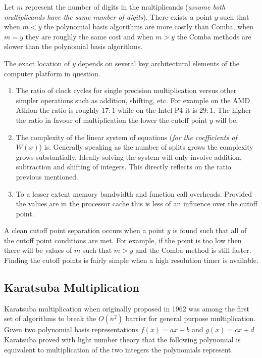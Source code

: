 \documentclass[b5paper]{book}
\begin{document}
Let $m$ represent the number of digits in the multiplicands (\textit{assume both multiplicands have the same number of digits}).  There exists a 
point $y$ such that when $m < y$ the polynomial basis algorithms are more costly than Comba, when $m = y$ they are roughly the same cost and 
when $m > y$ the Comba methods are slower than the polynomial basis algorithms.  

The exact location of $y$ depends on several key architectural elements of the computer platform in question.

\begin{enumerate}
\item  The ratio of clock cycles for single precision multiplication versus other simpler operations such as addition, shifting, etc.  For example
on the AMD Athlon the ratio is roughly $17 : 1$ while on the Intel P4 it is $29 : 1$.  The higher the ratio in favour of multiplication the lower
the cutoff point $y$ will be.  

\item  The complexity of the linear system of equations (\textit{for the coefficients of $W(x)$}) is.  Generally speaking as the number of splits
grows the complexity grows substantially.  Ideally solving the system will only involve addition, subtraction and shifting of integers.  This
directly reflects on the ratio previous mentioned.

\item  To a lesser extent memory bandwidth and function call overheads.  Provided the values are in the processor cache this is less of an
influence over the cutoff point.

\end{enumerate}

A clean cutoff point separation occurs when a point $y$ is found such that all of the cutoff point conditions are met.  For example, if the point
is too low then there will be values of $m$ such that $m > y$ and the Comba method is still faster.  Finding the cutoff points is fairly simple when
a high resolution timer is available.  

\subsection{Karatsuba Multiplication}
Karatsuba multiplication \cite{KARA} when originally proposed in 1962 was among the first set of algorithms to break the $O(n^2)$ barrier for
general purpose multiplication.  Given two polynomial basis representations $f(x) = ax + b$ and $g(x) = cx + d$ Karatsuba proved with 
light number theory \cite{KARAP} that the following polynomial is equivalent to multiplication of the two integers the polynomials represent.
\end{document}
